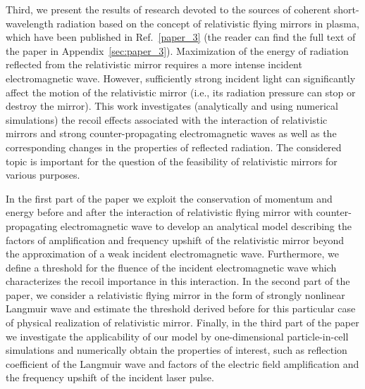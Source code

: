 \documentclass[10pt, a4paper, twoside, openright]{report}
\begin{document}
Third, we present the results of research devoted to the sources of coherent short-wavelength radiation based on the concept of relativistic flying mirrors in plasma, which have been published in Ref.~\ref{paper_3} (the reader can find the full text of the paper in Appendix~\ref{sec:paper_3}). Maximization of the energy of radiation reflected from the relativistic mirror requires a more intense incident electromagnetic wave. However, sufficiently strong incident light can significantly affect the motion of the relativistic mirror (i.e., its radiation pressure can stop or destroy the mirror). This work investigates (analytically and using numerical simulations) the recoil effects associated with the interaction of relativistic mirrors and strong counter-propagating electromagnetic waves as well as the corresponding changes in the properties of reflected radiation. The considered topic is important for the question of the feasibility of relativistic mirrors for various purposes.


In the first part of the paper we exploit the conservation of momentum and energy before and after the interaction of relativistic flying mirror with counter-propagating electromagnetic wave to develop an analytical model describing the factors of amplification and frequency upshift of the relativistic mirror beyond the approximation of a weak incident electromagnetic wave. Furthermore, we define a threshold for the fluence of the incident electromagnetic wave which characterizes the recoil importance in this interaction. In the second part of the paper, we consider a relativistic flying mirror in the form of strongly nonlinear Langmuir wave and estimate the threshold derived before for this particular case of physical realization of relativistic mirror. Finally, in the third part of the paper we investigate the applicability of our model by one-dimensional particle-in-cell simulations and numerically obtain the properties of interest, such as reflection coefficient of the Langmuir wave and factors of the electric field amplification and the frequency upshift of the incident laser pulse.
\end{document}

